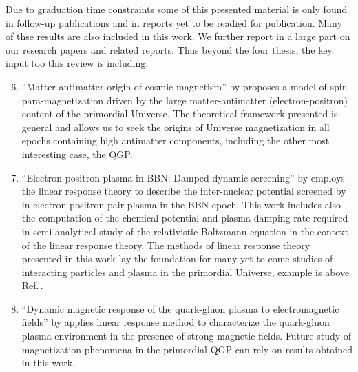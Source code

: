 Due to graduation time constraints some of this presented material is only found in follow-up publications and in reports yet to be readied for publication. Many of thse results are also included in this work. We further report in a large part on our research papers and related reports. Thus beyond the four thesis, the key input too this review is including:
\begin{enumerate}
\setcounter{enumi}{5}
%
\item ``Matter-antimatter origin of cosmic magnetism'' by  proposes a model of spin para-magnetization driven by the large matter-antimatter (electron-positron) content of the primordial Universe. {\color{blue} The theoretical framework presented is general and allows us to seek the origins of Universe magnetization in all epochs containing high antimatter components, including the other most interesting case, the QGP.}
%
\item ``Electron-positron plasma in BBN: Damped-dynamic screening'' by  employs the linear response theory to describe the inter-nuclear potential screened by in electron-positron pair plasma in the BBN epoch. This work includes also the computation of the chemical potential and plasma damping rate required in semi-analytical study of the relativistic Boltzmann equation in the context of the linear response theory. {\color{blue} The methods of linear response theory presented in this work lay the foundation for many yet to come studies of interacting particles and plasma in the primordial Universe, example is above Ref.\,\cite{Grayson:2024uwg}.}
%
\item ``Dynamic magnetic response of the quark-gluon plasma to electromagnetic fields'' by  applies linear response method to characterize the quark-gluon plasma environment in the presence of strong magnetic fields. {\color{blue} Future study of magnetization phenomena in the primordial QGP can rely on results obtained in this work.}

\end{enumerate}
